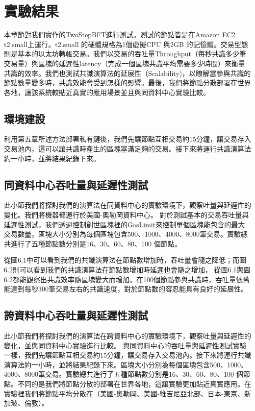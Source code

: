 \chapter{實驗結果} \label{se_6}
本章節對我們實作的TwoStepBFT進行測試。測試的節點皆是在Amazon EC2 t2.small上運行。t2.small 的硬體規格為1個虛擬CPU 與2GB 的記憶體。交易型態則是基本的以太坊轉帳交易。我們以交易的吞吐量Throughput（每秒共識多少筆交易量）與區塊的延遲性latency（完成一個區塊共識平均需要多少時間）來衡量共識的效率。我們也測試共識演算法的延展性（Scalability)，以瞭解當參與共識的節點數量變多時，共識效能會受到怎樣的影響。最後，我們將節點分散部署在世界各地，讓該系統較貼近真實的應用場景並且與同資料中心實驗比較。
\section{環境建設}\label{se_6}
利用第五章所述方法部署私有鏈後，我們先讓節點互相交易約15分鐘，讓交易存入交易池內，這可以讓共識時產生的區塊塞滿足夠的交易。接下來將運行共識演算法約一小時，並將結果紀錄下來。
\section{同資料中心吞吐量與延遲性測試}\label{se_6}
此小節我們將探討我們的演算法在同資料中心的實驗環境下，觀察吐量與延遲性的變化。我們將機器都運行於美國-奧勒岡資料中心。
對於測試基本的交易吞吐量與延遲性測試，我們透過控制創世區塊裡的GasLimit來控制單個區塊能包含的最大交易數量，區塊大小分別為每個區塊包含500、1000、4000、8000筆交易。實驗總共進行了五種節點數分別是16、30、60、80、100 個節點。
 


從圖6.1中可以看到我們的共識演算法在節點數增加時，吞吐量會隨之降低；而圖6.2則可以看到我們的共識演算法在節點數增加時延遲也會隨之增加，
從圖6.1與圖6.2都能觀察出共識效率隨區塊變大而增加。在100個節點參與共識時，吞吐量依舊能達到每秒300筆交易左右的共識速度，對於節點數的容忍能具有良好的延展性。



\section{誇資料中心吞吐量與延遲性測試}\label{se_6}
此小節我們將探討我們的演算法在跨資料中心的實驗環境下，觀察吐量與延遲性的變化，並與同資料中心實驗進行比較。
與同資料中心的吞吐量與延遲性測試實驗一樣，我們先讓節點互相交易約15分鐘，讓交易存入交易池內。接下來將運行共識演算法約一小時，並將結果紀錄下來。區塊大小分別為每個區塊包含500、1000、4000、8000筆交易。實驗總共進行了五種節點數分別是16、30、60、80、100 個節點。不同的是我們將節點分散的部署在世界各地，這讓實驗更加貼近真實應用。在實驗裡我們將節點平均分散在（美國-奧勒岡、美國-維吉尼亞北部、日本-東京、新加玻、倫敦）。



